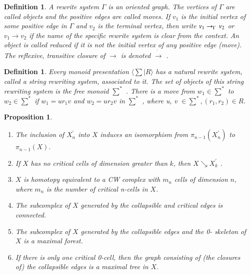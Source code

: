 \documentclass{amsart}
\newtheorem{Definition}[theorem]{Definition}
\newtheorem{proposition}[theorem]{Proposition}
\newenvironment{definition}{\begin{Definition}\normalfont}{\end{Definition}}
\begin{document}
\begin{definition}
A \textit{rewrite system} $\Gamma$ is an oriented graph. The vertices of $\Gamma$ are called \textit{objects} and
the positive edges are called \textit{moves}. If $v_1$ is the initial vertex of some positive
edge in $\Gamma$ and $v_2$ is the terminal vertex, then write $v_1 \rightarrow _\Gamma \thinspace v_2 $ or $v_1 \rightarrow v_2$ if
the name of the specific rewrite system is clear from the context. An object is
called \textit{reduced} if it is not the initial vertex of any positive edge (move). The
reflexive, transitive closure of $\rightarrow$ is denoted $\dot{\rightarrow}$ .
\end{definition}

\begin{definition}
Every monoid presentation $\langle\sum | R \rangle $ has a natural rewrite system, called a \textit{string
rewriting system}, associated to it. The set of objects of this string rewriting
system is the free monoid $\sum ^*$ . There is a move from $w_1 \in \sum^*$ to $w_2 \in  \sum^*$ if
$w_1 = ur_1v$ and $w_2 = ur_2v$ in $\sum^*$ , where u, v $\in \sum^*, (r_1, r_2) \in R$.
\end{definition}

\begin{proposition}
\begin{enumerate}
\item The inclusion of $X^\prime_n$ into $X$ induces an isomorphism from $\pi_{n-1}(X^\prime_n)$ to $\pi_{n-1}(X)$.
\item If $X$ has no critical cells of dimension greater than $k$, then $X \searrow X^\prime_k$ .
\item $X$ is homotopy equivalent to a CW complex with $m_n$
cells of dimension $n$, where $m_n$ is the number of critical n-cells in $X$.
\item The subcomplex of $X$ generated by the collapsible and critical edges is connected.
\item The subcomplex of $X$ generated by the collapsible edges and the 0- skeleton of $X$ is a maximal forest.
\item If there is only one critical 0-cell, then the graph consisting of (the closures of) the collapsible edges is a maximal tree in $X$.
\end{enumerate}

\end{proposition}
\end{document}
